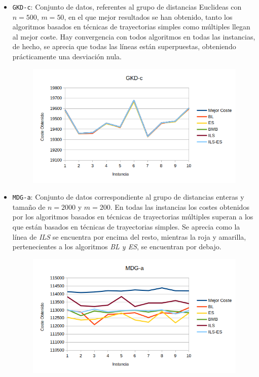 \begin{itemize}
	\item \texttt{GKD-c}: Conjunto de datos, referentes al grupo de distancias Euclideas con $n=500$, $m=50$,  en el que mejor resultados se han obtenido, tanto los algoritmos basados en técnicas de trayectorias simples como múltiples llegan al mejor coste.  Hay convergencia con todos algoritmos en todas las instancias, de hecho, se aprecia que todas las líneas están superpuestas, obteniendo prácticamente una desviación nula.
	
	
	\begin{figure}[H]
		\centering
		\includegraphics[scale=0.62]{img/gkdc.png}
	\end{figure}
	
	
	\newpage 
	
	\item \texttt{MDG-a}: Conjunto de datos correspondiente al grupo de distancias enteras y tamaño de $n=2000$ y $m=200$. En todas las instancias los costes obtenidos por los algoritmos basados en técnicas de trayectorias múltiples superan a los que están basados en técnicas de trayectorias simples. 
	Se aprecia como la línea de \textit{ILS} se encuentra por encima del resto, mientras la roja y amarilla, pertenecientes a los algoritmos \textit{BL y ES}, se encuentran por debajo.
	
	

	
	
	\begin{figure}[H]
		\centering
		\includegraphics[scale=0.62]{img/mdga.png}
	\end{figure}
	

\end{itemize}
